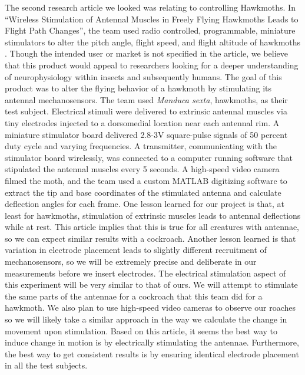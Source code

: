 \documentclass{article}
\begin{document}
\par The second research article we looked was relating to controlling Hawkmoths. In ``Wireless Stimulation of Antennal Muscles in Freely Flying Hawkmoths Leads to Flight Path Changes'', the team used radio controlled, programmable, miniature stimulators to alter the pitch angle, flight speed, and flight altitude of hawkmoths \cite{hinterwirth2012wireless}. Though the intended user or market is not specified in the article, we believe that this product would appeal to researchers looking for a deeper understanding of neurophysiology within insects and subsequently humans. The goal of this product was to alter the flying behavior of a hawkmoth by stimulating its antennal mechanosensors. The team used \emph{Manduca sexta}, hawkmoths, as their test subject. Electrical stimuli were delivered to extrinsic antennal muscles via tiny electrodes injected to a dorsomedial location near each antennal rim. A miniature stimulator board delivered 2.8-3V square-pulse signals of 50 percent duty cycle and varying frequencies. A transmitter, communicating with the stimulator board wirelessly, was connected to a computer running software that stipulated the antennal muscles every 5 seconds. A high-speed video camera filmed the moth, and the team used a custom MATLAB digitizing software to extract the tip and base coordinates of the stimulated antenna and calculate deflection angles for each frame. One lesson learned for our project is that, at least for hawkmoths, stimulation of extrinsic muscles leads to antennal deflections while at rest. This article implies that this is true for all creatures with antennae, so we can expect similar results with a cockroach. Another lesson learned is that variation in electrode placement leads to slightly different recruitment of mechanosensors, so we will be extremely precise and deliberate in our measurements before we insert electrodes. The electrical stimulation aspect of this experiment will be very similar to that of ours. We will attempt to stimulate the same parts of the antennae for a cockroach that this team did for a hawkmoth. We also plan to use high-speed video cameras to observe our roaches so we will likely take a similar approach in the way we calculate the change in movement upon stimulation. Based on this article, it seems the best way to induce change in motion is by electrically stimulating the antennae. Furthermore, the best way to get consistent results is by ensuring identical electrode placement in all the test subjects. 
\end{document}
